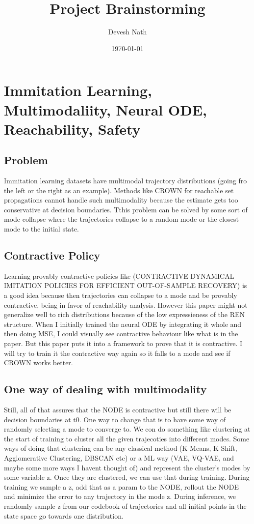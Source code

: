 \documentclass[12pt]{article}
\begin{document}
\title{Project Brainstorming}
\author{Devesh Nath}
\date{\today}

\maketitle

\section{Immitation Learning, Multimodaliity, Neural ODE, Reachability, Safety}
\subsection{Problem}
Immitation learning datasets have multimodal trajectory distributions (going fro the left or the right as an example). Methods like CROWN for reachable set propagations cannot handle such multimodality because the estimate gets too conservative at decision boundaries.
Tthis problem can be solved by some sort of mode collapse where the trajectories collapse to a random mode or the closest mode to the initial state.   

\subsection{Contractive Policy}
Learning provably contractive policies like (CONTRACTIVE DYNAMICAL IMITATION POLICIES FOR EFFICIENT OUT-OF-SAMPLE RECOVERY) is a good idea because then trajectories can collapse to a mode and be provably contractive, being in favor of reachability analysis. 
However this paper might not generalize well to rich distributions because of the low expressieness of the REN structure. When I initially trained the neural ODE by integrating it whole and then doing MSE, I could visually see contractive behaviour like what is in the paper.
But this paper puts it into a framework to prove that it is contractive. I will try to train it the contractive way again so it falls to a mode and see if CROWN works better. 

\subsection{One way of dealing with multimodality}
Still, all of that assures that the NODE is contractive but still there will be decision boundaries at t0. One way to change that is to have some way of randomly selecting a mode to converge to. We con do something like clustering at the start of training to cluster all the given trajecoties into different modes.
Some ways of doing that clustering can be any classical method (K Means, K Shift, Agglomerative Clustering, DBSCAN etc) or a ML way (VAE, VQ-VAE, and maybe some more ways I havent thought of) and represent the cluster's modes by some variable z. Once they are clustered, we can use that during training. During training we 
sample a z, add that as a param to the NODE, rollout the NODE and minimize the error to any trajectory in the mode z. During inference, we randomly sample z from our codebook of trajectories and all initial points in the state space go towards one distribution.
\end{document}
